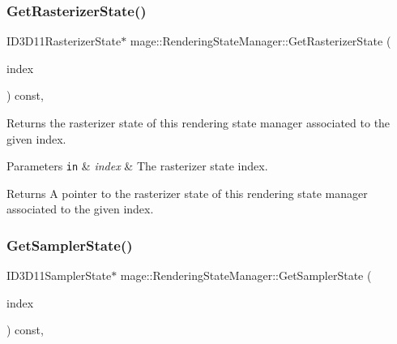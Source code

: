 \subsubsection{\texorpdfstring{Get\+Rasterizer\+State()}{GetRasterizerState()}}
{\footnotesize\ttfamily I\+D3\+D11\+Rasterizer\+State$\ast$ mage\+::\+Rendering\+State\+Manager\+::\+Get\+Rasterizer\+State (\begin{DoxyParamCaption}\item[{\hyperlink{classmage_1_1_rendering_state_manager_a72211dd35c1d3968717147572ca127da}{Rasterizer\+State\+Index}}]{index }\end{DoxyParamCaption}) const\hspace{0.3cm}{\ttfamily [private]}, {\ttfamily [noexcept]}}

Returns the rasterizer state of this rendering state manager associated to the given index.


\begin{DoxyParams}[1]{Parameters}
\mbox{\tt in}  & {\em index} & The rasterizer state index. \\
\hline
\end{DoxyParams}
\begin{DoxyReturn}{Returns}
A pointer to the rasterizer state of this rendering state manager associated to the given index. 
\end{DoxyReturn}
\hypertarget{classmage_1_1_rendering_state_manager_a951faf4db49ae4260100949aa941fd65}{}\label{classmage_1_1_rendering_state_manager_a951faf4db49ae4260100949aa941fd65} 
\subsubsection{\texorpdfstring{Get\+Sampler\+State()}{GetSamplerState()}}
{\footnotesize\ttfamily I\+D3\+D11\+Sampler\+State$\ast$ mage\+::\+Rendering\+State\+Manager\+::\+Get\+Sampler\+State (\begin{DoxyParamCaption}\item[{\hyperlink{classmage_1_1_rendering_state_manager_ad756bcfaf65de7ce2a7ac46e0ba97557}{Sampler\+State\+Index}}]{index }\end{DoxyParamCaption}) const\hspace{0.3cm}{\ttfamily [private]}, {\ttfamily [noexcept]}}

